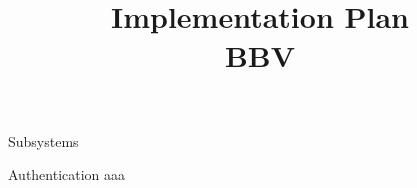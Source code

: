 \documentclass[10pt,a4paper]{article}
\title{
    Implementation Plan \\
    BBV
}
\begin{document}
\begin{section}{Subsystems}
    \begin{subsection}{Authentication}
        aaa
    \end{subsection}
\end{section}
\end{document}

